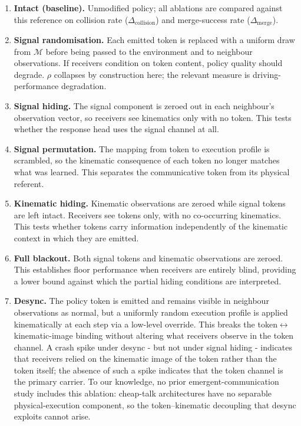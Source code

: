 \documentclass[12pt,a4paper]{article}
\begin{document}
\begin{enumerate}
    \item \textbf{Intact (baseline).} Unmodified policy; all ablations are compared against
    this reference on collision rate ($\Delta_\text{collision}$) and merge-success rate
    ($\Delta_\text{merge}$).

    \item \textbf{Signal randomisation.} Each emitted token is replaced with a uniform draw
    from $\mathcal{M}$ before being passed to the environment and to neighbour observations.
    If receivers condition on token content, policy quality should degrade. $\rho$ collapses by
    construction here; the relevant measure is driving-performance degradation.

    \item \textbf{Signal hiding.} The signal component is zeroed out in each neighbour's
    observation vector, so receivers see kinematics only with no token. This tests whether the
    response head uses the signal channel at all.

    \item \textbf{Signal permutation.} The mapping from token to execution profile is scrambled,
    so the kinematic consequence of each token no longer matches what was learned. This separates
    the communicative token from its physical referent.

    \item \textbf{Kinematic hiding.} Kinematic observations are zeroed while signal tokens are
    left intact. Receivers see tokens only, with no co-occurring kinematics. This tests whether
    tokens carry information independently of the kinematic context in which they are emitted.

    \item \textbf{Full blackout.} Both signal tokens and kinematic observations are zeroed.
    This establishes floor performance when receivers are entirely blind, providing a lower bound
    against which the partial hiding conditions are interpreted.

    \item \textbf{Desync.} The policy token is emitted and remains visible in neighbour
    observations as normal, but a uniformly random execution profile is applied kinematically
    at each step via a low-level override. This breaks the token$\leftrightarrow$kinematic-image
    binding without altering what receivers observe in the token channel. A crash spike under
    desync - but not under signal hiding - indicates that receivers relied on the kinematic image
    of the token rather than the token itself; the absence of such a spike indicates that the token
    channel is the primary carrier. To our knowledge, no prior emergent-communication study
    includes this ablation: cheap-talk architectures have no separable physical-execution
    component, so the token--kinematic decoupling that desync exploits cannot arise.
\end{enumerate}
\end{document}
